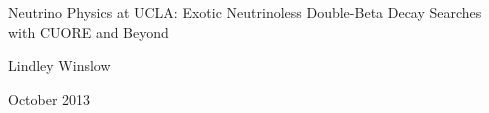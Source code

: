 \documentclass[11pt,letterpaper]{article}
\begin{document}
\begin{titlepage}
\begin{center}
{\LARGE Neutrino Physics at UCLA: Exotic Neutrinoless Double-Beta Decay Searches with CUORE and Beyond}

{\Large Lindley Winslow}

\vfill
{\Large October 2013}
\end{center}
\end{titlepage}

\tableofcontents
\setcounter{page}{0}


\setcounter{page}{1}


\setcounter{page}{1}


%

\setcounter{page}{0}

\setcounter{page}{1}


\setcounter{page}{1}



\setcounter{page}{1}


\setcounter{page}{1}


\setcounter{page}{1}


\setcounter{page}{1}
\end{document}
